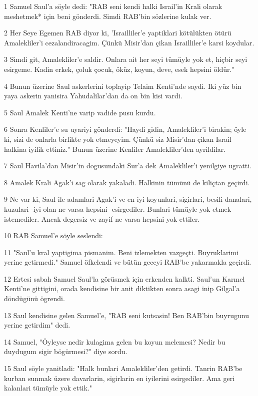 \par 1 Samuel Saul'a söyle dedi: "RAB seni kendi halki Israil'in Krali olarak meshetmek* için beni gönderdi. Simdi RAB'bin sözlerine kulak ver.
\par 2 Her Seye Egemen RAB diyor ki, 'Israilliler'e yaptiklari kötülükten ötürü Amalekliler'i cezalandiracagim. Çünkü Misir'dan çikan Israilliler'e karsi koydular.
\par 3 Simdi git, Amalekliler'e saldir. Onlara ait her seyi tümüyle yok et, hiçbir seyi esirgeme. Kadin erkek, çoluk çocuk, öküz, koyun, deve, esek hepsini öldür."
\par 4 Bunun üzerine Saul askerlerini toplayip Telaim Kenti'nde saydi. Iki yüz bin yaya askerin yanisira Yahudalilar'dan da on bin kisi vardi.
\par 5 Saul Amalek Kenti'ne varip vadide pusu kurdu.
\par 6 Sonra Kenliler'e su uyariyi gönderdi: "Haydi gidin, Amalekliler'i birakin; öyle ki, sizi de onlarla birlikte yok etmeyeyim. Çünkü siz Misir'dan çikan Israil halkina iyilik ettiniz." Bunun üzerine Kenliler Amalekliler'den ayrildilar.
\par 7 Saul Havila'dan Misir'in dogusundaki Sur'a dek Amalekliler'i yenilgiye ugratti.
\par 8 Amalek Krali Agak'i sag olarak yakaladi. Halkinin tümünü de kiliçtan geçirdi.
\par 9 Ne var ki, Saul ile adamlari Agak'i ve en iyi koyunlari, sigirlari, besili danalari, kuzulari -iyi olan ne varsa hepsini- esirgediler. Bunlari tümüyle yok etmek istemediler. Ancak degersiz ve zayif ne varsa hepsini yok ettiler.
\par 10 RAB Samuel'e söyle seslendi:
\par 11 "Saul'u kral yaptigima pismanim. Beni izlemekten vazgeçti. Buyruklarimi yerine getirmedi." Samuel öfkelendi ve bütün geceyi RAB'be yakarmakla geçirdi.
\par 12 Ertesi sabah Samuel Saul'la görüsmek için erkenden kalkti. Saul'un Karmel Kenti'ne gittigini, orada kendisine bir anit diktikten sonra asagi inip Gilgal'a döndügünü ögrendi.
\par 13 Saul kendisine gelen Samuel'e, "RAB seni kutsasin! Ben RAB'bin buyrugunu yerine getirdim" dedi.
\par 14 Samuel, "Öyleyse nedir kulagima gelen bu koyun melemesi? Nedir bu duydugum sigir bögürmesi?" diye sordu.
\par 15 Saul söyle yanitladi: "Halk bunlari Amalekliler'den getirdi. Tanrin RAB'be kurban sunmak üzere davarlarin, sigirlarin en iyilerini esirgediler. Ama geri kalanlari tümüyle yok ettik."
